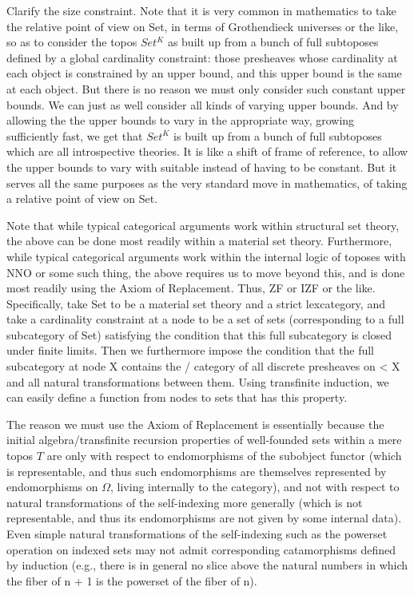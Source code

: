 \begin{TODOblock}
Clarify the size constraint. Note that it is very common in mathematics to take the relative point of view on Set, in terms of Grothendieck universes or the like, so as to consider the topos $Set^K$ as built up from a bunch of full subtoposes defined by a global cardinality constraint: those presheaves whose cardinality at each object is constrained by an upper bound, and this upper bound is the same at each object. But there is no reason we must only consider such constant upper bounds. We can just as well consider all kinds of varying upper bounds. And by allowing the the upper bounds to vary in the appropriate way, growing sufficiently fast, we get that $Set^K$ is built up from a bunch of full subtoposes which are all introspective theories. It is like a shift of frame of reference, to allow the upper bounds to vary with suitable  instead of having to be constant. But it serves all the same purposes as the very standard move in mathematics, of taking a relative point of view on Set.

Note that while typical categorical arguments work within structural set theory, the above can be done most readily within a material set theory. Furthermore, while typical categorical arguments work within the internal logic of toposes with NNO or some such thing, the above requires us to move beyond this, and is done most readily using the Axiom of Replacement. Thus, ZF or IZF or the like. Specifically, take Set to be a material set theory and a strict lexcategory, and take a cardinality constraint at a node to be a set of sets (corresponding to a full subcategory of Set) satisfying the condition that this full subcategory is closed under finite limits. Then we furthermore impose the condition that the full subcategory at node X contains the \setsmall/ category of all discrete presheaves on < X and all natural transformations between them. Using transfinite induction, we can easily define a function from nodes to sets that has this property.

The reason we must use the Axiom of Replacement is essentially because the initial algebra/transfinite recursion properties of well-founded sets within a mere topos $T$ are only with respect to endomorphisms of the subobject functor (which is representable, and thus such endomorphisms are themselves represented by endomorphisms on $\Omega$, living internally to the category), and not with respect to natural transformations of the self-indexing more generally (which is not representable, and thus its endomorphisms are not given by some internal data). Even simple natural transformations of the self-indexing such as the powerset operation on indexed sets may not admit corresponding catamorphisms defined by induction (e.g., there is in general no slice above the natural numbers in which the fiber of n + 1 is the powerset of the fiber of n).
\end{TODOblock}

